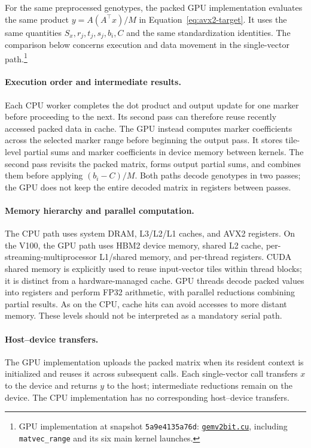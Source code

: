 \documentclass{article}
\begin{document}
For the same preprocessed genotypes, the packed GPU implementation
evaluates the same product $y=A(A^\top x)/M$ in
Equation~\eqref{eq:avx2-target}. It uses the same quantities
$S_x,r_j,t_j,s_j,b_i,C$ and the same standardization identities.
The comparison below concerns execution and data movement in the
single-vector path.\footnote{GPU implementation at snapshot
\texttt{5a9e4135a76d}:
\href{https://github.com/FrancisFengLu/SAIGE-cpp-comparison/blob/5a9e4135a76dab73d73274e930f27524c9712958/SAIGE_cpp_260716/step1_saige-null/tools/gpu_matvec/gemv2bit.cu}{\texttt{gemv2bit.cu}},
including \texttt{matvec\_range} and its six main kernel launches.}

\paragraph{Execution order and intermediate results.}
Each CPU worker completes the dot product and output update for one
marker before proceeding to the next. Its second pass can therefore
reuse recently accessed packed data in cache.
The GPU instead computes marker coefficients across the selected
marker range before beginning the output pass.
It stores tile-level partial sums and marker coefficients in device
memory between kernels. The second pass revisits the packed matrix,
forms output partial sums, and combines them before applying
$(b_i-C)/M$. Both paths decode genotypes in two passes; the GPU does
not keep the entire decoded matrix in registers between passes.

\paragraph{Memory hierarchy and parallel computation.}
The CPU path uses system DRAM, L3/L2/L1 caches, and AVX2 registers.
On the V100, the GPU path uses HBM2 device memory, shared L2 cache,
per-streaming-multiprocessor L1/shared memory, and per-thread registers.
CUDA shared memory is explicitly used to reuse input-vector tiles
within thread blocks; it is distinct from a hardware-managed cache.
GPU threads decode packed values into registers and perform FP32
arithmetic, with parallel reductions combining partial results.
As on the CPU, cache hits can avoid accesses to more distant memory.
These levels should not be interpreted as a mandatory serial path.

\paragraph{Host--device transfers.}
The GPU implementation uploads the packed matrix when its resident
context is initialized and reuses it across subsequent calls.
Each single-vector call transfers $x$ to the device and returns $y$
to the host; intermediate reductions remain on the device.
The CPU implementation has no corresponding host--device transfers.
\end{document}
